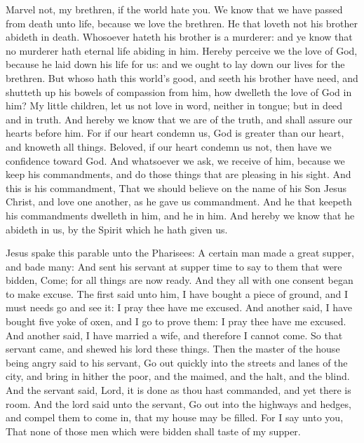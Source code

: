  Marvel not, my brethren, if the world hate you. We know that we have passed from death unto life, because we love the brethren. He that loveth not his brother abideth in death. Whosoever hateth his brother is a murderer: and ye know that no murderer hath eternal life abiding in him. Hereby perceive we the love of God, because he laid down his life for us: and we ought to lay down our lives for the brethren. But whoso hath this world's good, and seeth his brother have need, and shutteth up his bowels of compassion from him, how dwelleth the love of God in him? My little children, let us not love in word, neither in tongue; but in deed and in truth. And hereby we know that we are of the truth, and shall assure our hearts before him. For if our heart condemn us, God is greater than our heart, and knoweth all things. Beloved, if our heart condemn us not, then have we confidence toward God. And whatsoever we ask, we receive of him, because we keep his commandments, and do those things that are pleasing in his sight. And this is his commandment, That we should believe on the name of his Son Jesus Christ, and love one another, as he gave us commandment. And he that keepeth his commandments dwelleth in him, and he in him. And hereby we know that he abideth in us, by the Spirit which he hath given us.


 Jesus spake this parable unto the Pharisees: A certain man made a great supper, and bade many: And sent his servant at supper time to say to them that were bidden, Come; for all things are now ready. And they all with one consent began to make excuse. The first said unto him, I have bought a piece of ground, and I must needs go and see it: I pray thee have me excused. And another said, I have bought five yoke of oxen, and I go to prove them: I pray thee have me excused. And another said, I have married a wife, and therefore I cannot come. So that servant came, and shewed his lord these things. Then the master of the house being angry said to his servant, Go out quickly into the streets and lanes of the city, and bring in hither the poor, and the maimed, and the halt, and the blind. And the servant said, Lord, it is done as thou hast commanded, and yet there is room. And the lord said unto the servant, Go out into the highways and hedges, and compel them to come in, that my house may be filled. For I say unto you, That none of those men which were bidden shall taste of my supper.

